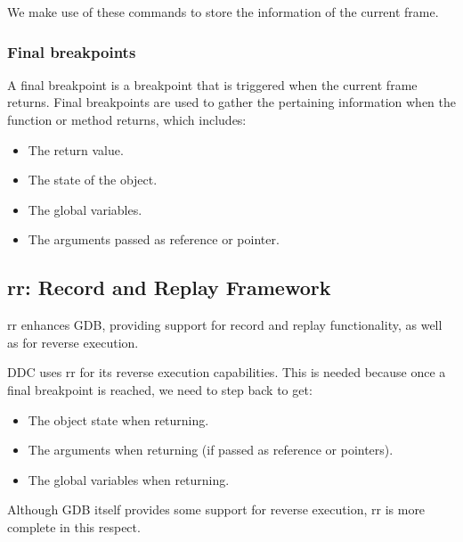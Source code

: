 We make use of these commands to store the information of the current frame.
\subsubsection{Final breakpoints}
A final breakpoint is a breakpoint that is triggered when the current frame returns. Final breakpoints are used to gather the pertaining information when the function or method returns, which includes:
\begin{itemize}
    \item The return value.
    \item The state of the object.
    \item The global variables.
    \item The arguments passed as reference or pointer.
\end{itemize}

\subsection{rr: Record and Replay Framework}

rr \cite{rr} enhances GDB, providing support for record and replay functionality, as well as for reverse execution.

DDC uses rr for its reverse execution capabilities. This is needed because once a final breakpoint is reached, we need to step back to get:
\begin{itemize}
    \item The object state when returning.
    \item The arguments when returning (if passed as reference or pointers).
    \item The global variables when returning.
\end{itemize}
Although GDB itself provides some support for reverse execution, rr is more complete in this respect.
